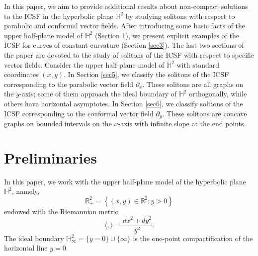 \documentclass[12pt]{amsart}
\theoremstyle{plain}
\theoremstyle{definition}
\def\h{\mathbb H}
\def\r{\mathbb R}
\begin{document}
In this paper, we aim to provide additional results about non-compact solutions to the ICSF in the hyperbolic plane $\h^2$ by studying solitons with respect to parabolic and conformal vector fields. After introducing some basic facts of the upper half-plane model of $\h^2$ (Section \ref{sec2}), we present explicit examples of the ICSF for curves of constant curvature (Section \ref{sec3}).  The last two sections of the paper are devoted to the study of solitons of the ICSF with respect to  specific vector fields. Consider the upper half-plane model of $\h^2$ with standard coordinates $(x,y)$. In Section \ref{sec5}, we classify the  solitons of the ICSF corresponding to the parabolic vector field $\partial_x$. These solitons are all graphs on the $y$-axis; some of them approach the ideal boundary of $\h^2$ orthogonally, while others have horizontal asymptotes. In Section \ref{sec6}, we classify solitons of the ICSF corresponding to the conformal vector field $\partial_y$.  These solitons are concave graphs on bounded intervals on the $x$-axis with infinite slope at the end points. 
 
 

\section{Preliminaries} \label{sec2}
In this paper, we work with the upper half-plane model of the hyperbolic plane $\h^2$, namely, 
$$\r^2_+= \left\{ (x,y) \in \r^2\colon y > 0\right\}$$
 endowed with the Riemannian metric 
 $$\langle,\rangle = \frac{dx^2 + dy^2}{y^2}.$$
 The ideal boundary $\h^2_\infty=\{y=0\}\cup\{\infty\}$ is the one-point compactification of the horizontal line $y=0$.  
\end{document}
